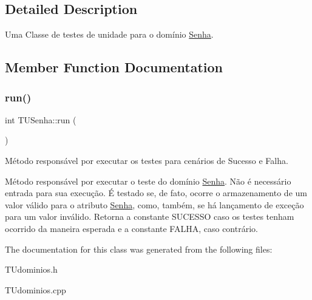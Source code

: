 \subsection{Detailed Description}
Uma Classe de testes de unidade para o domínio \hyperlink{classSenha}{Senha}. 

\subsection{Member Function Documentation}
\mbox{\label{classTUSenha_ac5ddea52ed42b828961f343b82074125}} 
\subsubsection{\texorpdfstring{run()}{run()}}
{\footnotesize\ttfamily int T\+U\+Senha\+::run (\begin{DoxyParamCaption}{ }\end{DoxyParamCaption})}



Método responsável por executar os testes para cenários de Sucesso e Falha. 

Método responsável por executar o teste do domínio \hyperlink{classSenha}{Senha}. Não é necessário entrada para sua execução. É testado se, de fato, ocorre o armazenamento de um valor válido para o atributo \hyperlink{classSenha}{Senha}, como, também, se há lançamento de exceção para um valor inválido. Retorna a constante S\+U\+C\+E\+S\+SO caso os testes tenham ocorrido da maneira esperada e a constante F\+A\+L\+HA, caso contrário. 

The documentation for this class was generated from the following files\+:\begin{DoxyCompactItemize}
\item 
T\+Udominios.\+h\item 
T\+Udominios.\+cpp\end{DoxyCompactItemize}
